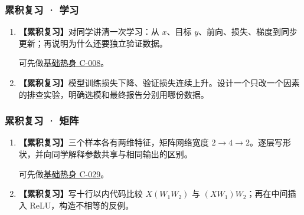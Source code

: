 \subsubsection*{累积复习 · 学习}
\begin{enumerate}[label={},leftmargin=4.8em,itemsep=4pt]
\item[\textbf{R-01.}] \leavevmode{}\label{exercise:R-01}\label{exercise:review-learning-cycle}\textbf{【累积复习】}对同学讲清一次学习：从 $x$、目标 $y$、前向、损失、梯度到同步更新；再说明为什么还要独立验证数据。\par 可先做\hyperref[exercise:synchronous-gradient-step]{基础热身 C-008}。
\item[\textbf{R-02.}] \leavevmode{}\label{exercise:R-02}\label{exercise:review-validation-experiment}\textbf{【累积复习】}模型训练损失下降、验证损失连续上升。设计一个只改一个因素的排查实验，明确选模和最终报告分别用哪份数据。
\end{enumerate}
\subsubsection*{累积复习 · 矩阵}
\begin{enumerate}[label={},leftmargin=4.8em,itemsep=4pt]
\item[\textbf{R-03.}] \leavevmode{}\label{exercise:R-03}\label{exercise:review-matrix-shapes}\textbf{【累积复习】}三个样本各有两维特征，矩阵网络宽度 $2\to4\to2$。逐层写形状，并向同学解释参数共享与相同输出的区别。\par 可先做\hyperref[exercise:matrix-single-entry]{基础热身 C-029}。
\item[\textbf{R-04.}] \leavevmode{}\label{exercise:R-04}\label{exercise:review-matrix-nonlinearity}\textbf{【累积复习】}写十行以内代码比较 $X(W_1W_2)$ 与 $(XW_1)W_2$；再在中间插入 ReLU，构造不相等的反例。
\end{enumerate}
